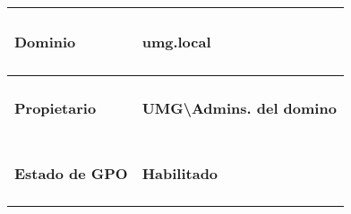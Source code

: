 \documentclass[
]{article}
\begin{document}
\begin{longtable}[]{@{}ll@{}}
\toprule
\begin{minipage}[b]{0.47\columnwidth}\raggedright
\hypertarget{dominio-2}{%
\paragraph{Dominio}\label{dominio-2}}\strut
\end{minipage} & \begin{minipage}[b]{0.47\columnwidth}\raggedright
\hypertarget{umg.local-2}{%
\paragraph{umg.local}\label{umg.local-2}}\strut
\end{minipage}\tabularnewline
\midrule
\endhead
\begin{minipage}[t]{0.47\columnwidth}\raggedright
\hypertarget{propietario-2}{%
\paragraph{Propietario}\label{propietario-2}}\strut
\end{minipage} & \begin{minipage}[t]{0.47\columnwidth}\raggedright
\hypertarget{umgadmins.-del-domino-1}{%
\paragraph{UMG\textbackslash Admins. del
domino}\label{umgadmins.-del-domino-1}}\strut
\end{minipage}\tabularnewline
\begin{minipage}[t]{0.47\columnwidth}\raggedright
\hypertarget{estado-de-gpo-2}{%
\paragraph{Estado de GPO}\label{estado-de-gpo-2}}\strut
\end{minipage} & \begin{minipage}[t]{0.47\columnwidth}\raggedright
\hypertarget{habilitado-3}{%
\paragraph{Habilitado}\label{habilitado-3}}\strut
\end{minipage}\tabularnewline
\bottomrule
\end{longtable}
\end{document}
